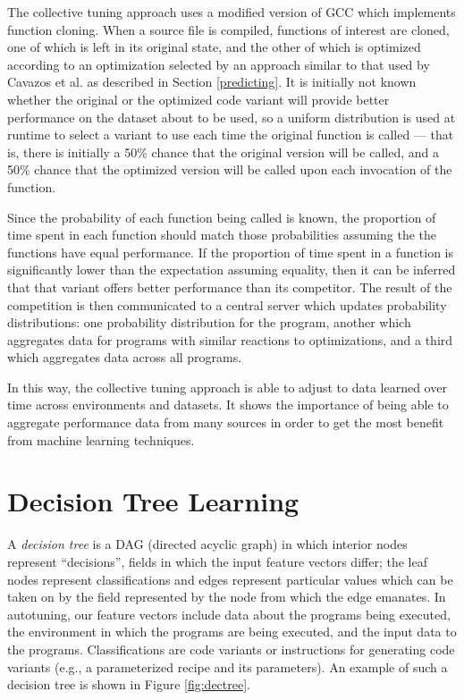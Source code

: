 \documentclass[msthesis,justified,copyright,final,numbers,sort&compress,
gsmodern,amstex,natbib]{uothesis}
\begin{document}
The collective tuning approach uses a modified version of GCC which implements function cloning. When a source file is compiled, functions of interest are cloned, one of which is left in its original state, and the other of which is optimized according to an optimization selected by an approach similar to that used by Cavazos et al. \cite{counters} as described in Section \ref{predicting}. It is initially not known whether the original or the optimized code variant will provide better performance on the dataset about to be used, so a uniform distribution is used at runtime to select a variant to use each time the original function is called --- that is, there is initially a 50\% chance that the original version will be called, and a 50\% chance that the optimized version will be called upon each invocation of the function. 

Since the probability of each function being called is known, the proportion of time spent in each function should match those probabilities assuming the the functions have equal performance. If the proportion of time spent in a function is significantly lower than the expectation assuming equality, then it can be inferred that that variant offers better performance than its competitor. The result of the competition is then communicated to a central server which updates probability distributions: one probability distribution for the program, another which aggregates data for programs with similar reactions to optimizations, and a third which aggregates data across all programs.

In this way, the collective tuning approach is able to adjust to data learned over time across environments and datasets. It shows the importance of being able to aggregate performance data from many sources in order to get the most benefit from machine learning techniques.

\section{Decision Tree Learning}
\label{tree}

A \emph{decision tree} is a DAG (directed acyclic graph) in which interior nodes represent ``decisions'', fields in which the input feature vectors differ; the leaf nodes represent classifications and edges represent particular values which can be taken on by the field represented by the node from which the edge emanates. In autotuning, our feature vectors include data about the programs being executed, the environment in which the programs are being executed, and the input data to the programs. Classifications are code variants or instructions for generating code variants (e.g., a parameterized recipe and its parameters). An example of such a decision tree is shown in Figure \ref{fig:dectree}.
\end{document}

